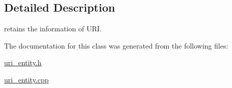 \subsection{Detailed Description}
retains the information of U\-R\-I. 

The documentation for this class was generated from the following files\-:\begin{DoxyCompactItemize}
\item 
\hyperlink{uri__entity_8h}{uri\-\_\-entity.\-h}\item 
\hyperlink{uri__entity_8cpp}{uri\-\_\-entity.\-cpp}\end{DoxyCompactItemize}
